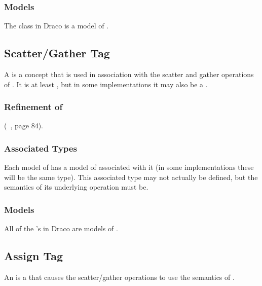 \documentclass[note]{newmemo}
\begin{document}
\subsubsection{Models}

The  class in Draco is a model of
.

\newpage

\subsection{Scatter/Gather Tag}
\label{sec:scatter gather tag}

A  is a concept that is used in
association with the scatter and gather operations of . It is at least , but in
some implementations it may also be a .

\subsubsection{Refinement of}
 (~\cite{au99}, page 84).

\subsubsection{Associated Types}

Each model of  has a model of
 associated with it (in some implementations these
will be the same type). This associated type may not actually be
defined, but the semantics of its underlying operation must be.

\subsubsection{Models}

All of the  's in Draco are
models of .

\bigskip

\subsection{Assign Tag}

An  is a  that causes
the  scatter/gather operations to use the
semantics of .
\end{document}
